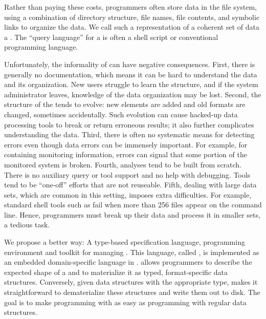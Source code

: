 
Rather than paying these costs, programmers often store data in
the file system, using a combination of directory structure, file
names, file contents, and symbolic links to organize the data.  We call such a
representation of a coherent set of data a \textit{\filestore{}}.
The ``query language'' for a \filestore{}
is often a shell script or conventional programming language.

Unfortunately, the informality of \filestores{} can have
negative consequences.  First, there is generally no documentation,
which means it can be hard to understand the data and its
organization.  New users struggle to learn the structure, and if
the system administrator leaves, knowledge of the data
organization may be lost.  Second, the structure of the \filestore{} tends
to evolve: new elements are added and old formats are changed, sometimes
accidentally.  Such evolution can cause hacked-up data processing
tools to break or return erroneous results; it also further complicates
understanding the data.  Third, there is often no
systematic means for detecting errors even though data errors can
be immensely
important.  For example, for \filestores{} containing monitoring information,
errors can signal that some portion of the monitored system is broken.
Fourth, analyses tend to be built from scratch.
There is no auxiliary query or tool support and no help with debugging.
Tools tend to be ``one-off'' efforts that are not
reuseable.  Fifth, dealing with
large data sets, which are common in this setting, imposes extra
difficulties.  For example,  standard shell tools
such as  fail when more than 256 files appear on the
command line.  Hence, programmers must  break up their data
and process it in smaller sets, a tedious task.

We propose a better way: A type-based
specification language, programming environment and toolkit for
managing \filestores{}.  
This language, called \forest{}, is implemented as an embedded domain-specific
language in \haskell{}.
\forest{} allows programmers to describe the expected shape of a
\filestore{} and to materialize it as typed,
format-specific \haskell{} data structures.  Conversely,
given data structures with the appropriate type, \forest{}
makes it straightforward to dematerialize these structures
and write them out to disk.  The
goal is to make programming with \filestores{} as
easy as programming with regular \haskell{} data
structures.  


